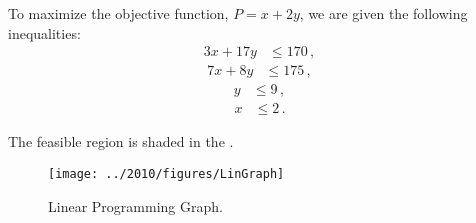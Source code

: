 %
%
\usetikzlibrary{patterns}

\begin{subquestions}
	

\subquestion

To maximize the objective function, $P = x+2y$, we are given the following inequalities:
\begin{align}
	3x + 17y & \leq 170 \,, 
	\end{align}
\begin{align}
	7x + 8y & \leq 175 \,, 
	\end{align}
\begin{align}
	y & \leq 9 \,, 
	\end{align}
\begin{align}
	x & \leq 2 \,.
\end{align}

\begin{subsubquestions}
	

\subsubquestion

The feasible region is shaded in the .
\begin{figure}[H]
	\begin{center}
		\texttt{[image: ../2010/figures/LinGraph]}
		\caption{\label{2010:q1:fig:LinGraph} Linear Programming Graph.}
	\end{center}
\end{figure}



\end{subsubquestions}
\end{subquestions}

